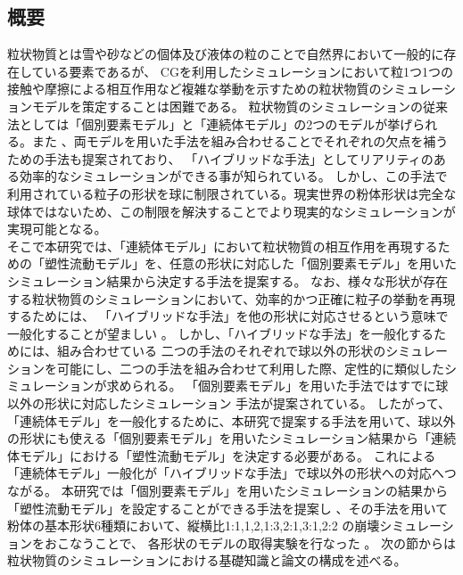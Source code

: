 \documentclass[12pt]{ltjsarticle}
\begin{document}
\subsection{概要}
粒状物質とは雪や砂などの個体及び液体の粒のことで自然界において一般的に存在している要素であるが、
CGを利用したシミュレーションにおいて粒1つ1つの接触や摩擦による相互作用など複雑な挙動を示すための粒状物質のシミュレーションモデルを策定することは困難である。
粒状物質のシミュレーションの従来法としては「個別要素モデル」と「連続体モデル」の2つのモデルが挙げられる。また 、両モデルを用いた手法を組み合わせることでそれぞれの欠点を補うための手法も提案されており、
「ハイブリッドな手法」としてリアリティのある効率的なシミュレーションができる事が知られている。
しかし、この手法で利用されている粒子の形状を球に制限されている。現実世界の粉体形状は完全な球体ではないため、この制限を解決することでより現実的なシミュレーションが実現可能となる。\\
そこで本研究では、「連続体モデル」において粒状物質の相互作用を再現するための「塑性流動モデル」を、任意の形状に対応した「個別要素モデル」を用いたシミュレーション結果から決定する手法を提案する。
なお、様々な形状が存在する粒状物質のシミュレーションにおいて、効率的かつ正確に粒子の挙動を再現するためには、
「ハイブリッドな手法」を他の形状に対応させるという意味で一般化することが望ましい 。
しかし、「ハイブリッドな手法」を一般化するためには、組み合わせている 二つの手法のそれぞれで球以外の形状のシミュレーションを可能にし、二つの手法を組み合わせて利用した際、定性的に類似したシミュレーションが求められる。
「個別要素モデル」を用いた手法ではすでに球以外の形状に対応したシミュレーション 手法が提案されている。
したがって、「連続体モデル」を一般化するために、本研究で提案する手法を用いて、球以外の形状にも使える「個別要素モデル」を用いたシミュレーション結果から「連続体モデル」における「塑性流動モデル」を決定する必要がある。
これによる「連続体モデル」一般化が「ハイブリッドな手法」で球以外の形状への対応へつながる。
本研究では「個別要素モデル」を用いたシミュレーションの結果から「塑性流動モデル」を設定することができる手法を提案し 、その手法を用いて粉体の基本形状6種類において、縦横比1:1,1,2,1:3,2:1,3:1,2:2 の崩壊シミュレーションをおこなうことで、
各形状のモデルの取得実験を行なった 。
次の節からは粒状物質のシミュレーションにおける基礎知識と論文の構成を述べる。
\end{document}
